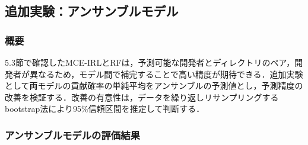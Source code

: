 \documentclass[submit,noauthor,ses,dvipdfmx]{ipsj}
\newcommand{\todo}[1]{\colorbox{yellow}{{\bf TODO}:}{\color{red} {\textbf{[#1]}}}}
\begin{document}






\subsection{追加実験：アンサンブルモデル}

\subsubsection{概要}
5.3節で確認したMCE-IRLとRFは，予測可能な開発者とディレクトリのペア，開発者が異なるため，モデル間で補完することで高い精度が期待できる．追加実験として両モデルの貢献確率の単純平均をアンサンブルの予測値とし，予測精度の改善を検証する．改善の有意性は，データを繰り返しリサンプリングする
bootstrap法により95\%信頼区間を推定して判断する．


\subsubsection{アンサンブルモデルの評価結果}
\end{document}

